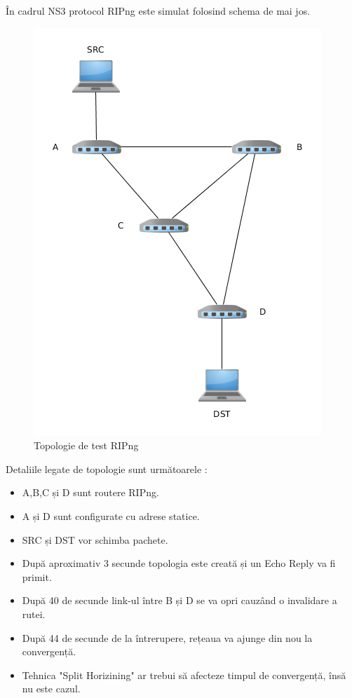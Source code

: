 \documentclass[12pt, a4paper, oneside, romanian]{teza-upb}
\begin{document}
În cadrul NS3 protocol RIPng este simulat folosind schema de mai jos.
\begin{figure}[H]
\centering
\includegraphics*[scale=0.5]{img/RIPng.png}
\caption{Topologie de test RIPng}
\label{fig:punguta}
\end{figure}
 Detaliile legate de topologie sunt următoarele :
\begin{itemize}
 \item A,B,C și D sunt routere RIPng.
 \item A și D sunt configurate cu adrese statice.
 \item SRC și DST vor schimba pachete.
 \item După aproximativ 3 secunde topologia este creată și un Echo Reply va fi primit.
 \item După 40 de secunde link-ul între B și D se va opri cauzând o invalidare a rutei.
 \item După 44 de secunde de la întrerupere, rețeaua va ajunge din nou la convergență.
 \item Tehnica "Split Horizining" ar trebui să afecteze timpul de convergență, însă nu este cazul.
\end{itemize}
\end{document}
